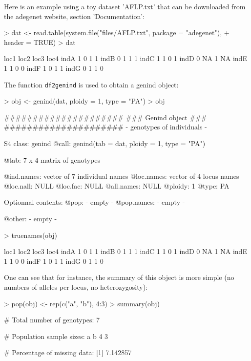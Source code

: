 \documentclass{article}
\begin{document}
Here is an example using a toy dataset 'AFLP.txt' that can be downloaded
from the adegenet website, section 'Documentation':
\begin{Schunk}
\begin{Sinput}
> dat <- read.table(system.file("files/AFLP.txt", package = "adegenet"), 
+     header = TRUE)
> dat
\end{Sinput}
\begin{Soutput}
     loc1 loc2 loc3 loc4
indA    1    0    1    1
indB    0    1    1    1
indC    1    1    0    1
indD    0   NA    1   NA
indE    1    1    0    0
indF    1    0    1    1
indG    0    1    1    0
\end{Soutput}
\end{Schunk}
\noindent The function \texttt{df2genind} is used to obtain a genind object:
\begin{Schunk}
\begin{Sinput}
> obj <- genind(dat, ploidy = 1, type = "PA")
> obj
\end{Sinput}
\begin{Soutput}
   #####################
   ### Genind object ### 
   #####################
- genotypes of individuals - 

S4 class:  genind
@call: genind(tab = dat, ploidy = 1, type = "PA")

@tab:  7 x 4 matrix of genotypes

@ind.names: vector of  7 individual names
@loc.names: vector of  4 locus names
@loc.nall: NULL
@loc.fac: NULL
@all.names: NULL
@ploidy:  1
@type:  PA

Optionnal contents: 
@pop:  - empty -
@pop.names:  - empty -

@other: - empty -
\end{Soutput}
\begin{Sinput}
> truenames(obj)
\end{Sinput}
\begin{Soutput}
     loc1 loc2 loc3 loc4
indA    1    0    1    1
indB    0    1    1    1
indC    1    1    0    1
indD    0   NA    1   NA
indE    1    1    0    0
indF    1    0    1    1
indG    0    1    1    0
\end{Soutput}
\end{Schunk}

One can see that for instance, the summary of this object is more simple (no numbers of alleles per locus, no heterozygosity):
\begin{Schunk}
\begin{Sinput}
> pop(obj) <- rep(c("a", "b"), 4:3)
> summary(obj)
\end{Sinput}
\begin{Soutput}
 # Total number of genotypes:  7 

 # Population sample sizes:  
a b 
4 3 

 # Percentage of missing data:  
[1] 7.142857
\end{Soutput}
\end{Schunk}
\end{document}
